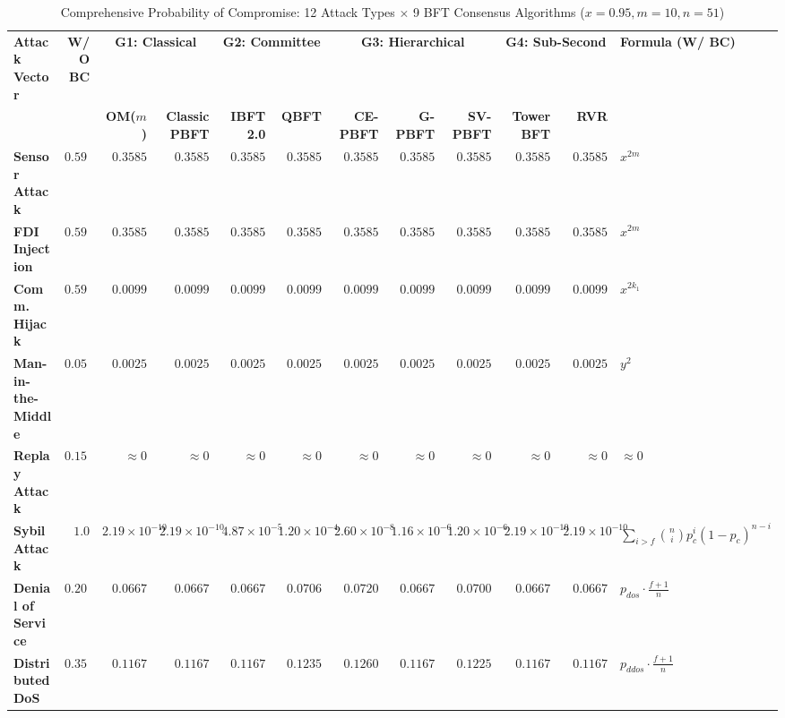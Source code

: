 \begin{table}[t]
\caption{Comprehensive Probability of Compromise: 12 Attack Types $\times$ 9 BFT Consensus Algorithms ($x=0.95, m=10, n=51$)}
\label{tab:prob_compromise_full}
\centering
\tiny
\begin{tabular}{@{}lrrrrrrrrrrl@{}}
\toprule
\textbf{Attack Vector} & \textbf{W/O BC} & \multicolumn{2}{c}{\textbf{G1: Classical}} & \multicolumn{2}{c}{\textbf{G2: Committee}} & \multicolumn{3}{c}{\textbf{G3: Hierarchical}} & \multicolumn{2}{c}{\textbf{G4: Sub-Second}} & \textbf{Formula (W/ BC)} \\
\cmidrule(lr){3-4} \cmidrule(lr){5-6} \cmidrule(lr){7-9} \cmidrule(lr){10-11}
& & \textbf{OM($m$)} & \textbf{Classic PBFT} & \textbf{IBFT 2.0} & \textbf{QBFT} & \textbf{CE-PBFT} & \textbf{G-PBFT} & \textbf{SV-PBFT} & \textbf{Tower BFT} & \textbf{RVR} & \\
\midrule
\textbf{Sensor Attack} & $0.5987$ & $0.3585$ & $0.3585$ & $0.3585$ & $0.3585$ & $0.3585$ & $0.3585$ & $0.3585$ & $0.3585$ & $0.3585$ & $x^{2m}$ \\
\textbf{FDI Injection} & $0.5987$ & $0.3585$ & $0.3585$ & $0.3585$ & $0.3585$ & $0.3585$ & $0.3585$ & $0.3585$ & $0.3585$ & $0.3585$ & $x^{2m}$ \\
\textbf{Comm. Hijack} & $0.5987$ & $0.0099$ & $0.0099$ & $0.0099$ & $0.0099$ & $0.0099$ & $0.0099$ & $0.0099$ & $0.0099$ & $0.0099$ & $x^{2k_1}$ \\
\textbf{Man-in-the-Middle} & $0.0500$ & $0.0025$ & $0.0025$ & $0.0025$ & $0.0025$ & $0.0025$ & $0.0025$ & $0.0025$ & $0.0025$ & $0.0025$ & $y^2$ \\
\textbf{Replay Attack} & $0.1500$ & $\approx 0$ & $\approx 0$ & $\approx 0$ & $\approx 0$ & $\approx 0$ & $\approx 0$ & $\approx 0$ & $\approx 0$ & $\approx 0$ & $\approx 0$ \\
\textbf{Sybil Attack} & $1.0$ & $2.19 \times 10^{-10}$ & $2.19 \times 10^{-10}$ & $4.87 \times 10^{-5}$ & $1.20 \times 10^{-4}$ & $2.60 \times 10^{-8}$ & $1.16 \times 10^{-6}$ & $1.20 \times 10^{-6}$ & $2.19 \times 10^{-10}$ & $2.19 \times 10^{-10}$ & $\sum_{i>f} \binom{n}{i} p_c^i (1-p_c)^{n-i}$ \\
\textbf{Denial of Service} & $0.2000$ & $0.0667$ & $0.0667$ & $0.0667$ & $0.0706$ & $0.0720$ & $0.0667$ & $0.0700$ & $0.0667$ & $0.0667$ & $p_{dos} \cdot \frac{f+1}{n}$ \\
\textbf{Distributed DoS} & $0.3500$ & $0.1167$ & $0.1167$ & $0.1167$ & $0.1235$ & $0.1260$ & $0.1167$ & $0.1225$ & $0.1167$ & $0.1167$ & $p_{ddos} \cdot \frac{f+1}{n}$ \\

\end{tabular}
\end{table}
